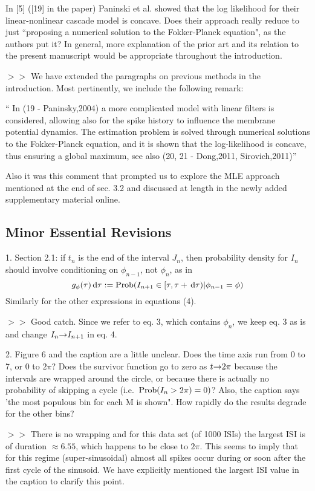 \documentclass{article}
\begin{document}
In [5] ([19] in the paper) Paninski et al. showed that the log likelihood for
their linear-nonlinear cascade model is concave. Does their approach really reduce to
just ``proposing a numerical solution to the Fokker-Planck equation", as the
authors put it? In general, more explanation of the prior art and its relation
to the present manuscript would be appropriate throughout the introduction.

$>>$ We have extended the paragraphs on previous methods in the introduction.
Most pertinently, we include the following remark:

`` In (19 - Paninsky,2004) a more complicated model with linear filters is
considered, allowing also for the spike history to influence the membrane
potential dynamics. The estimation problem is solved through numerical solutions
to the Fokker-Planck equation, and it is shown that the log-likelihood is
concave, thus ensuring a global maximum, see also (20, 21 - Dong,2011,
Sirovich,2011)''

Also it was this comment that prompted us to explore the MLE approach mentioned
at the end of sec. 3.2 and discussed at length in the newly added supplementary
material online.


\subsection{Minor Essential Revisions}
1. Section 2.1: if $t_n$ is the end of the interval $J_n$, then probability
density for $I_n$ should involve conditioning on $\phi_{n-1}$, not $\phi_n$, as
in
$$
g_{\phi}(\tau) \, \mathrm{d} \tau := \operatorname{Prob}(I_{n+1} \in [\tau, \tau + \, \mathrm{d} \tau)  | \phi_{n-1}
= \phi) $$
Similarly for the other expressions in equations (4).

$>>$ Good catch. Since we refer to eq. 3, which contains $\phi_n$, we
keep eq. 3 as is and change $I_n {\rightarrow} I_{n+1}$ in eq. 4.

\vskip 10pt

2. Figure 6 and the caption are a little unclear. Does the time axis run from 0
to 7, or 0 to $2 \pi$? Does the survivor function go to zero as $t {\rightarrow} 2 \pi$
because the intervals are wrapped around the circle, or because there is
actually no probability of skipping a cycle (i.e.\ $\operatorname{Prob}(I_n > 2 \pi) = 0)$?
Also, the caption says 'the most populous bin for each M is shown". How rapidly
do the results degrade for the other bins?

$>>$ There is  no wrapping and for this data set (of 1000 ISIs) the largest ISI
is of duration $\approx 6.55$, which happens to be close to $2
\pi$. This seems to imply that for this regime (super-sinusoidal) almost
all spikes occur during or soon after the first cycle of the
sinusoid. We have explicitly mentioned the largest ISI value in the
caption to clarify this point.
\end{document}
